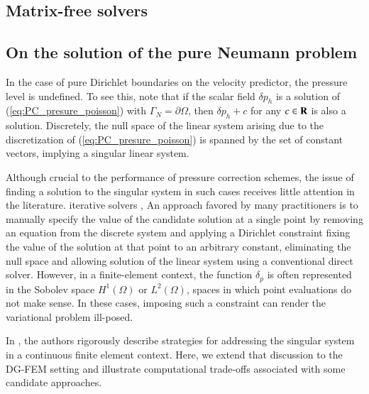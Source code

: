 \subsection{Matrix-free solvers}%
\label{sec:numerical_expeiments:matrix_free}


\subsection{On the solution of the pure Neumann problem}

In the case of pure Dirichlet boundaries on the velocity predictor, the pressure level is undefined. 
To see this, note that if the scalar field $\delta p_h$ is a solution of (\ref{eq:PC_presure_poisson}) with $\Gamma_N = \partial \Omega$, then $\delta p_h + c$ for any $c \in {\mbox{\bf R}}$ is also a solution. 
Discretely, the null space of the linear system arising due to the discretization of (\ref{eq:PC_presure_poisson}) is spanned by the set of constant vectors, implying a singular linear system.


Although crucial to the performance of pressure correction schemes, the issue of finding a solution to the singular system in such cases receives little attention in the literature. 
iterative solvers \cite{axelsson_iterative_1996,iankov_finite_2013}, 
An approach favored by many practitioners is to manually specify the value of the candidate solution at a single point by removing an equation from the discrete system and applying a Dirichlet constraint fixing the value of the solution at that point to an arbitrary constant, eliminating the null space and allowing solution of the linear system using a conventional direct solver.
However, in a finite-element context, the function $\delta_p$ is often represented in the Sobolev space $H^1(\Omega)$ or $L^2(\Omega)$, spaces in which point evaluations do not make sense. 
In these cases, imposing such a constraint can render the variational problem ill-posed.



In \cite{bochev_finite_2005}, the authors rigorously describe strategies for addressing the singular system in a continuous finite element context. 
Here, we extend that discussion to the DG-FEM setting and illustrate computational trade-offs associated with some candidate approaches.

